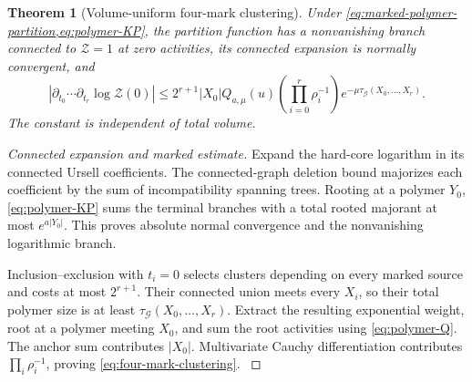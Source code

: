 \documentclass[11pt,oneside,openany]{book}
\newtheorem{theorem}{Theorem}[chapter]
\theoremstyle{definition}
\theoremstyle{remark}
\newcommand{\src}[2]{\cite[#2]{#1}}
\begin{document}
\begin{theorem}[Volume-uniform four-mark clustering]
\label{thm:four-mark-clustering}
Under \cref{eq:marked-polymer-partition,eq:polymer-KP}, the partition
function has a nonvanishing branch connected to $\mathcal Z=1$ at zero
activities, its connected expansion is normally convergent, and
\begin{equation}\label{eq:four-mark-clustering}
\left|\partial_{t_0}\cdots\partial_{t_r}\log\mathcal Z(0)\right|
\le 2^{r+1}|X_0|Q_{a,\mu}(u)
 \left(\prod_{i=0}^r\rho_i^{-1}\right)
 e^{-\mu\tau_\mathcal G(X_0,\ldots,X_r)}.
\end{equation}
The constant is independent of total volume.
\end{theorem}
\begin{proof}[Connected expansion and marked estimate]
Expand the hard-core logarithm in its connected Ursell coefficients.
The connected-graph deletion bound majorizes each coefficient by the
sum of incompatibility spanning trees. Rooting at a polymer $Y_0$,
\cref{eq:polymer-KP} sums the terminal branches with a total rooted
majorant at most $e^{a|Y_0|}$. This proves absolute normal convergence
and the nonvanishing logarithmic branch.

Inclusion--exclusion with $t_i=0$ selects clusters depending on every
marked source and costs at most $2^{r+1}$. Their connected union meets
every $X_i$, so their total polymer size is at least
$\tau_\mathcal G(X_0,\ldots,X_r)$. Extract the resulting exponential
weight, root at a polymer meeting $X_0$, and sum the root activities
using \cref{eq:polymer-Q}. The anchor sum contributes $|X_0|$.
Multivariate Cauchy differentiation contributes
$\prod_i\rho_i^{-1}$, proving \cref{eq:four-mark-clustering}.
\src{F8}{V61}
\end{proof}
\end{document}
